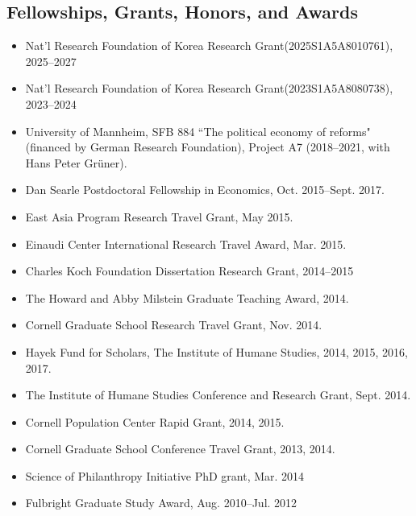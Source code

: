 \documentclass[margin, a4paper]{res}
\begin{document}
\begin{resume}
\section{Fellowships, Grants, Honors, and Awards}
\begin{itemize}[leftmargin=*]
\item Nat'l Research Foundation of Korea Research Grant(2025S1A5A8010761), 2025--2027
\item Nat'l Research Foundation of Korea Research Grant(2023S1A5A8080738), 2023--2024
\item University of Mannheim, SFB 884 ``The political economy of reforms" (financed by German Research Foundation), Project A7 (2018--2021, with Hans Peter Gr{\"u}ner).
\item Dan Searle Postdoctoral Fellowship in Economics, Oct. 2015--Sept. 2017.
\item East Asia Program Research Travel Grant, May 2015.
\item Einaudi Center International Research Travel Award, Mar. 2015.
\item Charles Koch Foundation Dissertation Research Grant, 2014--2015
\item The Howard and Abby Milstein Graduate Teaching Award, 2014.
\item Cornell Graduate School Research Travel Grant, Nov. 2014.
\item Hayek Fund for Scholars, The Institute of Humane Studies, 2014, 2015, 2016, 2017.
\item The Institute of Humane Studies Conference and Research Grant, Sept. 2014.
\item Cornell Population Center Rapid Grant, 2014, 2015.
\item Cornell Graduate School Conference Travel Grant, 2013, 2014.
\item Science of Philanthropy Initiative PhD grant, Mar. 2014
\item Fulbright Graduate Study Award, Aug. 2010--Jul. 2012
\end{itemize}


\end{resume}
\end{document}
